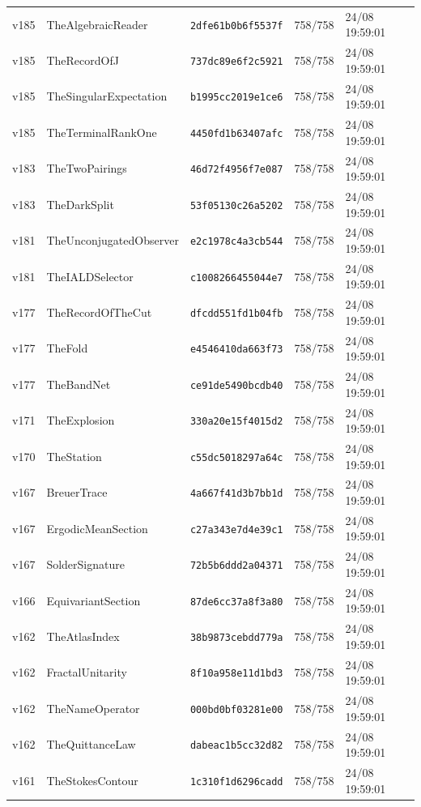 \documentclass[11pt]{article}
\theoremstyle{definition}\newtheorem{deriv}{Derivation}
\begin{document}
{\begin{longtable}{@{}lllll@{}}
v185 & TheAlgebraicReader & \texttt{2dfe61b0b6f5537f} & 758/758 & 24/08 19:59:01 \\
v185 & TheRecordOfJ & \texttt{737dc89e6f2c5921} & 758/758 & 24/08 19:59:01 \\
v185 & TheSingularExpectation & \texttt{b1995cc2019e1ce6} & 758/758 & 24/08 19:59:01 \\
v185 & TheTerminalRankOne & \texttt{4450fd1b63407afc} & 758/758 & 24/08 19:59:01 \\
v183 & TheTwoPairings & \texttt{46d72f4956f7e087} & 758/758 & 24/08 19:59:01 \\
v183 & TheDarkSplit & \texttt{53f05130c26a5202} & 758/758 & 24/08 19:59:01 \\
v181 & TheUnconjugatedObserver & \texttt{e2c1978c4a3cb544} & 758/758 & 24/08 19:59:01 \\
v181 & TheIALDSelector & \texttt{c1008266455044e7} & 758/758 & 24/08 19:59:01 \\
v177 & TheRecordOfTheCut & \texttt{dfcdd551fd1b04fb} & 758/758 & 24/08 19:59:01 \\
v177 & TheFold & \texttt{e4546410da663f73} & 758/758 & 24/08 19:59:01 \\
v177 & TheBandNet & \texttt{ce91de5490bcdb40} & 758/758 & 24/08 19:59:01 \\
v171 & TheExplosion & \texttt{330a20e15f4015d2} & 758/758 & 24/08 19:59:01 \\
v170 & TheStation & \texttt{c55dc5018297a64c} & 758/758 & 24/08 19:59:01 \\
v167 & BreuerTrace & \texttt{4a667f41d3b7bb1d} & 758/758 & 24/08 19:59:01 \\
v167 & ErgodicMeanSection & \texttt{c27a343e7d4e39c1} & 758/758 & 24/08 19:59:01 \\
v167 & SolderSignature & \texttt{72b5b6ddd2a04371} & 758/758 & 24/08 19:59:01 \\
v166 & EquivariantSection & \texttt{87de6cc37a8f3a80} & 758/758 & 24/08 19:59:01 \\
v162 & TheAtlasIndex & \texttt{38b9873cebdd779a} & 758/758 & 24/08 19:59:01 \\
v162 & FractalUnitarity & \texttt{8f10a958e11d1bd3} & 758/758 & 24/08 19:59:01 \\
v162 & TheNameOperator & \texttt{000bd0bf03281e00} & 758/758 & 24/08 19:59:01 \\
v162 & TheQuittanceLaw & \texttt{dabeac1b5cc32d82} & 758/758 & 24/08 19:59:01 \\
v161 & TheStokesContour & \texttt{1c310f1d6296cadd} & 758/758 & 24/08 19:59:01 \\

\end{longtable}}
\end{document}
